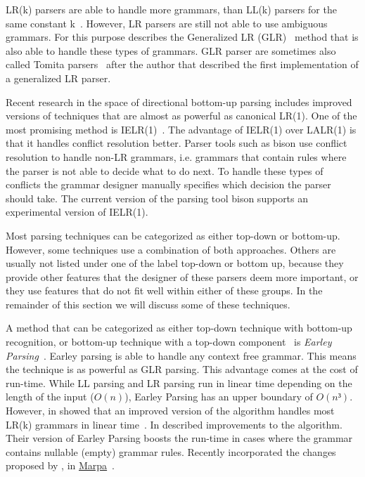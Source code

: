 LR(k) parsers are able to handle more grammars, than LL(k) parsers for the same constant k~\cite[section “Lookahead”]{haberman2013ll}. However, LR parsers are still not able to use ambiguous grammars. For this purpose \citeauthor{lang1974deterministic} describes the Generalized LR (GLR)~\cite{lang1974deterministic} method that is also able to handle these types of grammars. GLR parser are sometimes also called Tomita parsers~\cite{tomita1985efficient} after the author that described the first implementation of a generalized LR parser.

Recent research in the space of directional bottom-up parsing includes improved versions of techniques that are almost as powerful as canonical LR(1). One of the most promising method is IELR(1)~\cite{denny2008ielr}. The advantage of IELR(1) over LALR(1) is that it handles conflict resolution better. Parser tools such as bison use conflict resolution to handle non-LR grammars, i.e. grammars that contain rules where the parser is not able to decide what to do next. To handle these types of conflicts the grammar designer manually specifies which decision the parser should take. The current version of the parsing tool bison supports an experimental version of IELR(1).

Most parsing techniques can be categorized as either top-down or bottom-up. However, some techniques use a combination of both approaches. Others are usually not listed under one of the label top-down or bottom up, because they provide other features that the designer of these parsers deem more important, or they use features that do not fit well within either of these groups. In the remainder of this section we will discuss some of these techniques.

A method that can be categorized as either top-down technique with bottom-up recognition, or bottom-up technique with a top-down component~\cite[p. 206]{grune2007parsing} is \emph{Earley Parsing}~\cite{earley1970efficient}. Earley parsing is able to handle any context free grammar. This means the technique is as powerful as GLR parsing. This advantage comes at the cost of run-time. While LL parsing and LR parsing run in linear time depending on the length of the input ($O(n)$), Earley Parsing has an upper boundary of $O(n³)$. However, in \citeyear{leo1991general} \citeauthor{leo1991general} showed that an improved version of the algorithm handles most LR(k) grammars in linear time~\cite{kegler2011marpa, leo1991general, wikipedia2016Earley}. In \citeyear{aycock2002practical} \citeauthor{aycock2002practical} described improvements to the algorithm. Their version of Earley Parsing boosts the run-time in cases where the grammar contains nullable (empty) grammar rules. Recently \citeauthor{kegler2011marpa} incorporated the changes proposed by \citeauthor{leo1991general}, \citeauthor{aycock2002practical} in \href{http://savage.net.au/Marpa.html}{Marpa}~\cite{kegler2011marpa}.

